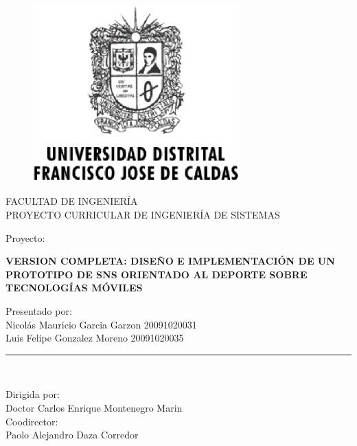 \documentclass[letter,12pt]{book}
\begin{document}
  \begin{titlepage}

    \begin{center}
      \vspace*{-1in}
      \begin{figure}[htb]
    \begin{center}
      \includegraphics[width=8cm]{imagenes/Logo_Distrital.eps}
    \end{center}
    \end{figure}

    FACULTAD DE INGENIERÍA\\
    \vspace*{0.15in}
    PROYECTO CURRICULAR DE INGENIERÍA DE SISTEMAS \\
    \vspace*{0.6in}
    \begin{large}
    Proyecto:\\
    \end{large}
    \vspace*{0.2in}
    \begin{Large}
    \textbf{VERSION COMPLETA: DISEÑO E IMPLEMENTACIÓN DE UN PROTOTIPO DE SNS ORIENTADO AL DEPORTE SOBRE TECNOLOGÍAS MÓVILES} \\ 
    \end{Large}
    \vspace*{0.3in}
    \begin{large}
    Presentado por:\\
      Nicolás Mauricio Garcia Garzon 20091020031 \\
      Luis Felipe Gonzalez Moreno 20091020035
    \end{large}
    \vspace*{0.3in}
    \rule{80mm}{0.1mm}\\
    \vspace*{0.1in}
    \begin{large}
    Dirigida por: \\
    Doctor Carlos Enrique Montenegro Marin \\
    Coodirector: \\
    Paolo Alejandro Daza Corredor \\
    \end{large}
    \end{center}

    \end{titlepage}
\end{document}
